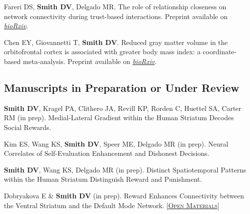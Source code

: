\documentclass[11pt, letterpaper]{article}
\newcommand{\biorxiv}[1]{\href{#1}{\textit{bioRxiv}}}
\newcommand{\materials}[1]{\href{#1}{\scriptsize\textsc{[Open Materials]}}}
\begin{document}
\begin{hangparas}{.5in}{1}
Fareri DS, \textbf{Smith DV}, Delgado MR. The role of relationship closeness on network connectivity during trust-based interactions. Preprint available on \biorxiv{https://www.biorxiv.org/content/10.1101/815274v2}.

Chen EY, Giovannetti T, \textbf{Smith DV}. Reduced gray matter volume in the orbitofrontal cortex is associated with greater body mass index: a coordinate-based meta-analysis. Preprint available on \biorxiv{https://www.biorxiv.org/content/early/2018/06/30/359919}. \\

\end{hangparas}


\subsection*{Manuscripts in Preparation or Under Review}

\begin{hangparas}{.5in}{1}


\textbf{Smith DV}, Kragel PA, Clithero JA, Revill KP, Rorden C, Huettel SA, Carter RM (in prep). Medial-Lateral Gradient within the Human Striatum Decodes Social Rewards.


Kim ES, Wang KS, \textbf{Smith DV}, Speer ME, Delgado MR (in prep). Neural Correlates of Self-Evaluation Enhancement and Dishonest Decisions.

\textbf{Smith DV}, Wang KS, Delgado MR (in prep). Distinct Spatiotemporal Patterns within the Human Striatum Distinguish Reward and Punishment.

Dobryakova E \& \textbf{Smith DV} (in prep). Reward Enhances Connectivity between the Ventral Striatum and the Default Mode Network. \materials{https://github.com/edobryakova/DobryakovaSmith_HCP} \\

\end{hangparas}


\vspace{.4cm}
\end{document}
